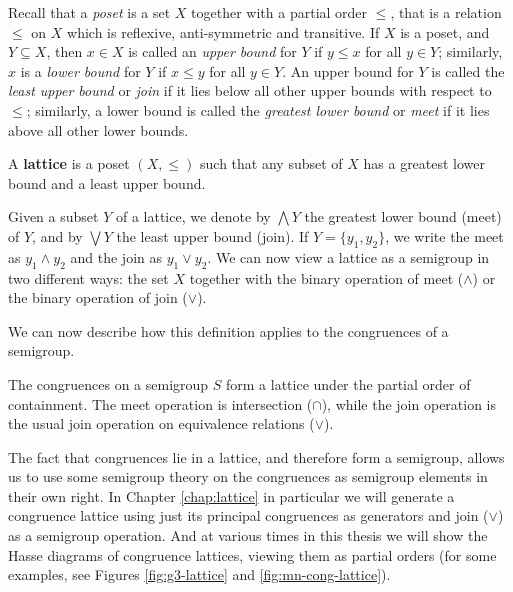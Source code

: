 Recall that a \textit{poset} is a set $X$ together with a partial order $\leq$,
that is a relation $\leq$ on $X$ which is reflexive, anti-symmetric and
transitive.  If $X$ is a poset, and $Y \subseteq X$, then $x \in X$ is called an
\textit{upper bound} for $Y$ if $y \leq x$ for all $y \in Y$; similarly, $x$ is
a \textit{lower bound} for $Y$ if $x \leq y$ for all $y \in Y$.  An upper bound
for $Y$ is called the \textit{least upper bound} or \textit{join} if it lies
below all other upper bounds with respect to $\leq$; similarly, a lower bound is
called the \textit{greatest lower bound} or \textit{meet} if it lies above all
other lower bounds.    
   

\begin{definition}
  \label{def:lattice}
  A \textbf{lattice} is a poset $(X, \leq)$ such that any subset of $X$ has
  a greatest lower bound and a least upper bound.
\end{definition}

Given a subset $Y$ of a lattice, we denote by $\bigwedge Y$ the greatest lower
bound (meet) of $Y$, and by $\bigvee Y$ the least upper bound (join).  If
$Y = \{y_1, y_2\}$, we write the meet as $y_1 \wedge y_2$ and the join as
$y_1 \vee y_2$.  We can now view a lattice as a semigroup in two different ways:
the set $X$ together with the binary operation of meet ($\wedge$) or the binary
operation of join ($\vee$).

We can now describe how this definition applies to the congruences of a
semigroup.

\begin{proposition}
  \label{prop:cong-lattice}
  The congruences on a semigroup $S$ form a lattice under the partial order of
  containment.  The meet operation is intersection ($\cap$), while the join
  operation is the usual join operation on equivalence relations ($\vee$).
\end{proposition}

The fact that congruences lie in a lattice, and therefore form a semigroup,
allows us to use some semigroup theory on the congruences as semigroup elements
in their own right.  In Chapter \ref{chap:lattice} in particular we will
generate a congruence lattice using just its principal congruences as generators
and join ($\vee$) as a semigroup operation.  And at various times in this thesis
we will show the Hasse diagrams of congruence lattices, viewing them as partial
orders (for some examples, see Figures \ref{fig:g3-lattice} and
\ref{fig:mn-cong-lattice}).

